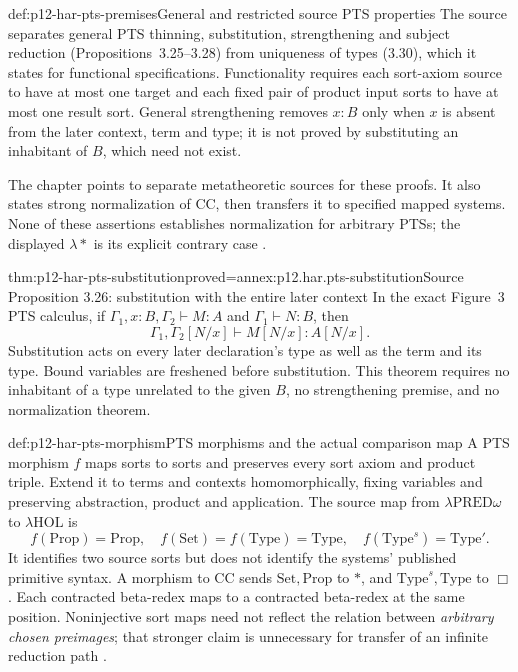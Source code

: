 \begin{hbdefinition}{def:p12-har-pts-premises}{General and restricted source PTS properties}
The source separates general PTS thinning, substitution, strengthening
and subject reduction (Propositions~3.25--3.28) from uniqueness of types
(3.30), which it states for functional specifications. Functionality
requires each sort-axiom source to have at most one target and each fixed
pair of product input sorts to have at most one result sort. General
strengthening removes \(x:B\) only when \(x\) is absent from
the later context, term and type; it is not proved by substituting an
inhabitant of \(B\), which need not exist.

The chapter points to separate metatheoretic sources for these proofs.
It also states strong normalization of \(\mathrm{CC}\), then transfers
it to specified mapped systems. None of these assertions establishes
normalization for arbitrary PTSs; the displayed \(\lambda\ast\)
is its explicit contrary case \cite[pp.~1199--1201]{BarendregtGeuvers2001}.
\end{hbdefinition}

\begin{hbtheorem}{thm:p12-har-pts-substitution}{proved=annex:p12.har.pts-substitution}{Source Proposition 3.26: substitution with the entire later context}
In the exact Figure~3 PTS calculus, if
\(\Gamma_1,x:B,\Gamma_2\vdash M:A\) and
\(\Gamma_1\vdash N:B\), then
\[
 \Gamma_1,\Gamma_2[N/x]\vdash M[N/x]:A[N/x].
\]
Substitution acts on every later declaration's type as well as the
term and its type. Bound variables are freshened before substitution.
This theorem requires no inhabitant of a type unrelated to the given
\(B\), no strengthening premise, and no normalization theorem.
\end{hbtheorem}

\begin{hbdefinition}{def:p12-har-pts-morphism}{PTS morphisms and the actual comparison map}
A PTS morphism \(f\) maps sorts to sorts and preserves every sort
axiom and product triple. Extend it to terms and contexts homomorphically,
fixing variables and preserving abstraction, product and application.
The source map from \(\lambda\mathrm{PRED}\omega\) to
\(\lambda\mathrm{HOL}\) is
\[
 f(\mathrm{Prop})=\mathrm{Prop},\quad
 f(\mathrm{Set})=f(\mathrm{Type})=\mathrm{Type},\quad
 f(\mathrm{Type}^s)=\mathrm{Type}'.
\]
It identifies two source sorts but does not identify the systems'
published primitive syntax. A morphism to \(\mathrm{CC}\) sends
\(\mathrm{Set},\mathrm{Prop}\) to \(\ast\), and
\(\mathrm{Type}^s,\mathrm{Type}\) to \(\Box\).
Each contracted beta-redex maps to a contracted beta-redex at the same
position. Noninjective sort maps need not reflect the relation between
\emph{arbitrary chosen preimages}; that stronger claim is unnecessary
for transfer of an infinite reduction path
\cite[pp.~1200--1202, Definition~3.31; Proposition~3.32]{BarendregtGeuvers2001}.
\end{hbdefinition}

